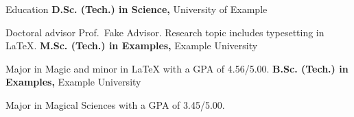 \begin{rubric}{Education}
\entry*[Aug 2023 --]
	\textbf{D.Sc. (Tech.) in Science,} University of Example
	
	Doctoral advisor Prof.~Fake Advisor.
	Research topic includes typesetting in \LaTeX{}.
%
	\textbf{M.Sc. (Tech.) in Examples,} Example University
	
	Major in Magic and minor in \LaTeX{} with a GPA of 4.56/5.00.
%
	\textbf{B.Sc. (Tech.) in Examples,} Example University
	
	Major in Magical Sciences with a GPA of 3.45/5.00.
\end{rubric}